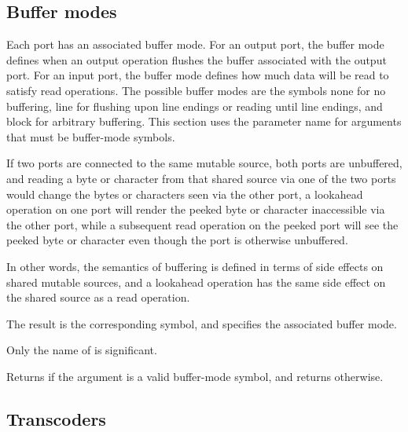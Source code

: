 \subsection{Buffer modes}

Each port has an associated buffer mode.  For an output port, the
buffer mode defines when an output operation flushes the buffer
associated with the output port.  For an input port, the buffer mode
defines how much data will be read to satisfy read operations.  The
possible buffer modes are the symbols {\cf none} for no buffering,
{\cf line} for flushing upon line endings or reading until line
endings, and {\cf block} for arbitrary buffering.  This section uses
the parameter name  for arguments that must be
buffer-mode symbols.

If two ports are connected to the same mutable source, both ports
are unbuffered, and reading a byte or character from that shared
source via one of the two ports would change the bytes or characters
seen via the other port, a lookahead operation on one port will
render the peeked byte or character inaccessible via the other port,
while a subsequent read operation on the peeked port will see the
peeked byte or character even though the port is otherwise unbuffered.

In other words, the semantics of buffering is defined in terms of side
effects on shared mutable sources, and a lookahead operation has the
same side effect on the shared source as a read operation.

\begin{entry}{%
}
   
 The result is the
corresponding symbol, and specifies the associated buffer mode.

\begin{note}
  Only the name of  is significant.
\end{note}
\end{entry}

\begin{entry}{%
}
   
Returns \schtrue{} if the argument is a valid buffer-mode symbol,
and returns \schfalse{} otherwise.
\end{entry}

\subsection{Transcoders}
\label{transcoderssection}

